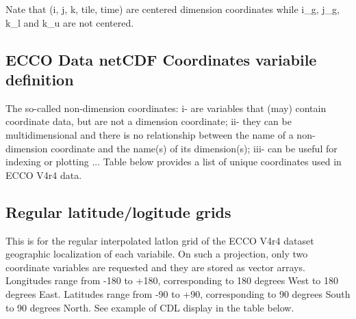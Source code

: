 

\par Nate that (i, j, k, tile, time) are centered dimension coordinates while i\_g, j\_g, k\_l and k\_u are not centered.

\subsection{ECCO Data netCDF Coordinates variabile definition}

The so-called non-dimension coordinates: i- are variables that (may) contain coordinate data, but are not a dimension coordinate; ii- they can be multidimensional and there is no relationship between the name of a non-dimension coordinate and the name(s) of its dimension(s); iii- can be useful for indexing or plotting ... Table below provides a list of unique coordinates used in ECCO V4r4 data.


\subsection*{Regular latitude/logitude grids}
\par This is for the regular interpolated latlon grid of the ECCO V4r4 dataset geographic localization of each variabile. On such a projection, only two coordinate variables are requested and they are stored as vector arrays. Longitudes range from -180 to +180, corresponding to 180 degrees West to 180 degrees East. Latitudes range from -90 to +90, corresponding to 90 degrees South to 90 degrees North. See example of CDL display in the table below.

